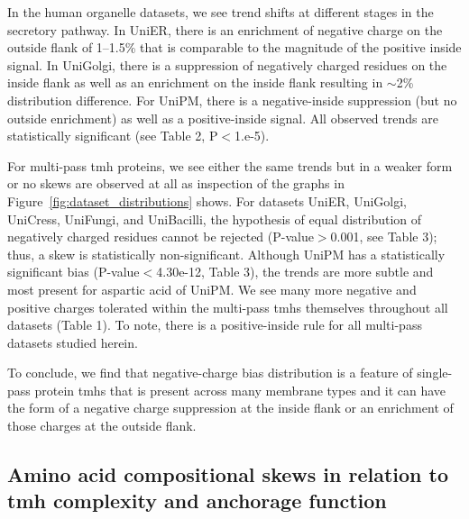 In the human organelle datasets, we see trend shifts at different stages in the secretory pathway. In UniER, there is an enrichment of negative charge on the outside flank of 1--1.5\% that is comparable to the magnitude of the positive inside signal. In UniGolgi, there is a suppression of negatively charged residues on the inside flank as well as an enrichment on the inside flank resulting in \(\sim\)2\% distribution difference. For UniPM, there is a negative-inside suppression (but no outside enrichment) as well as a positive-inside signal. All observed trends are statistically significant (see Table 2, P$<$1.e-5).

For multi-pass \gls{tmh} proteins, we see either the same trends but in a weaker form or no skews are observed at all as inspection of the graphs in Figure~\ref{fig:dataset_distributions} shows. For datasets UniER, UniGolgi, UniCress, UniFungi, and UniBacilli, the hypothesis of equal distribution of negatively charged residues cannot be rejected (P-value$>$0.001, see Table 3); thus, a skew is statistically non-significant. Although UniPM has a statistically significant bias (P-value$<$4.30e-12, Table 3), the trends are more subtle and most present for aspartic acid of UniPM\@. We see many more negative and positive charges tolerated within the multi-pass \gls{tmh}s themselves throughout all datasets (Table 1). To note, there is a positive-inside rule for all multi-pass datasets studied herein.

To conclude, we find that negative-charge bias distribution is a feature of single-pass protein \gls{tmh}s that is present across many membrane types and it can have the form of a negative charge suppression at the inside flank or an enrichment of those charges at the outside flank.

\subsection{Amino acid compositional skews in relation to \gls{tmh} complexity and anchorage function}

